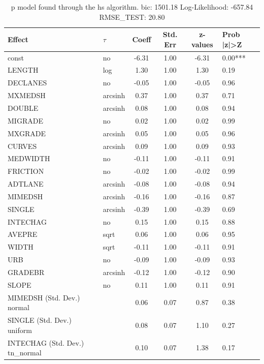 \begin{table}
	\caption{p model found through the hs algorithm. bic: 1501.18 Log-Likelihood: -657.84 RMSE_TEST: 20.80}
	\begin{center}
		\begin{tabular}{|l|l|c|c|c|l|}
			\hline
			Effect & $\tau$ & Coeff & Std. Err & z-values & Prob |z|>Z \\
			\hline
			const & no & -6.31 & 1.00 & -6.31 & 0.00*** \\
			\hline
			LENGTH & log & 1.30 & 1.00 & 1.30 & 0.19 \\
			\hline
			DECLANES & no & -0.05 & 1.00 & -0.05 & 0.96 \\
			\hline
			MXMEDSH & arcsinh & 0.37 & 1.00 & 0.37 & 0.71 \\
			\hline
			DOUBLE & arcsinh & 0.08 & 1.00 & 0.08 & 0.94 \\
			\hline
			MIGRADE & no & 0.02 & 1.00 & 0.02 & 0.99 \\
			\hline
			MXGRADE & arcsinh & 0.05 & 1.00 & 0.05 & 0.96 \\
			\hline
			CURVES & arcsinh & 0.09 & 1.00 & 0.09 & 0.93 \\
			\hline
			MEDWIDTH & no & -0.11 & 1.00 & -0.11 & 0.91 \\
			\hline
			FRICTION & no & -0.02 & 1.00 & -0.02 & 0.99 \\
			\hline
			ADTLANE & arcsinh & -0.08 & 1.00 & -0.08 & 0.94 \\
			\hline
			MIMEDSH & arcsinh & -0.16 & 1.00 & -0.16 & 0.87 \\
			\hline
			SINGLE & arcsinh & -0.39 & 1.00 & -0.39 & 0.69 \\
			\hline
			INTECHAG & no & 0.15 & 1.00 & 0.15 & 0.88 \\
			\hline
			AVEPRE & sqrt & 0.06 & 1.00 & 0.06 & 0.95 \\
			\hline
			WIDTH & sqrt & -0.11 & 1.00 & -0.11 & 0.91 \\
			\hline
			URB & no & -0.09 & 1.00 & -0.09 & 0.93 \\
			\hline
			GRADEBR & arcsinh & -0.12 & 1.00 & -0.12 & 0.90 \\
			\hline
			SLOPE & no & 0.11 & 1.00 & 0.11 & 0.91 \\
			\hline
			MIMEDSH (Std. Dev.) normal &  & 0.06 & 0.07 & 0.87 & 0.38 \\
			\hline
			SINGLE (Std. Dev.) uniform &  & 0.08 & 0.07 & 1.10 & 0.27 \\
			\hline
			INTECHAG (Std. Dev.) tn_normal &  & 0.10 & 0.07 & 1.38 & 0.17 \\

\end{tabular}
\end{center}
\end{table}

